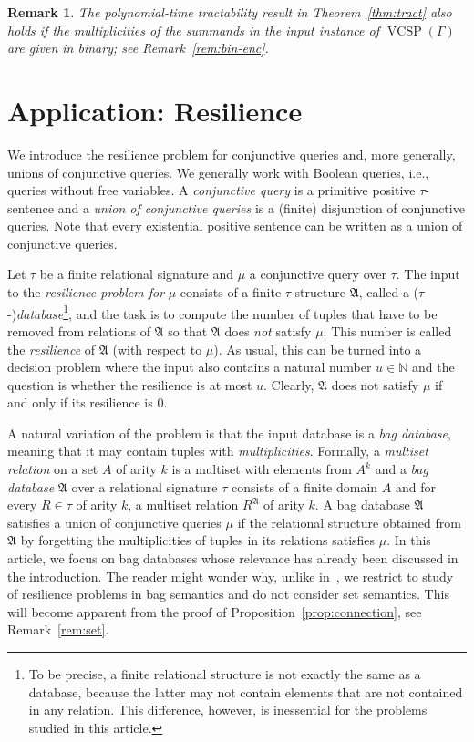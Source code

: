 \documentclass[nonacm]{acmart}
\newcommand{\bA}{{\mathfrak A}}
\DeclareMathOperator{\VCSP}{VCSP}
\newtheorem{remark}[theorem]{Remark}
\begin{document}
\begin{remark}\label{rem:bin-enc-2}
    The polynomial-time tractability result in Theorem~\ref{thm:tract} also holds if the multiplicities of the summands in the input instance of 
    $\VCSP(\Gamma)$ are given in binary; see Remark~\ref{rem:bin-enc}.
\end{remark}

\section{Application: Resilience}
\label{sect:resilience}

We introduce the resilience problem for
conjunctive queries and, more generally,
unions of conjunctive queries.
We generally work with Boolean queries, i.e., queries without free variables. 
A \emph{conjunctive query} is a primitive positive $\tau$-sentence and 
a \emph{union of conjunctive queries} is a (finite) disjunction of conjunctive
queries. Note that every existential positive sentence can be written as a union of conjunctive queries.

Let $\tau$ be a finite relational signature and $\mu$ a conjunctive query  over $\tau$. The input to the \emph{resilience problem for} $\mu$ consists of 
a finite $\tau$-structure $\bA$, called a ($\tau$-)\emph{database}\footnote{To be precise, a finite relational structure is not exactly the same as a database, because the latter may not contain elements that are not contained in any relation. This difference, however, is inessential for the problems studied in this article.}, and the 
task is to compute the number of tuples that have to be removed from relations of $\bA$ so that $\bA$ does \emph{not} satisfy $\mu$. This number is called the \emph{resilience} of $\bA$ (with respect to $\mu$). 
As usual, this can be turned into a decision problem where the input also contains a natural number $u \in {\mathbb N}$ and the question is whether the resilience is at most $u$. 
Clearly, $\bA$ does not satisfy $\mu$ if and only if its resilience is $0$. 

 A natural variation of the problem is that the input database is a \emph{bag database}, meaning that it may contain tuples with \emph{multiplicities}. 
Formally,
 a \emph{multiset relation} on a set $A$ of arity $k$ is a multiset with elements from $A^k$ and a \emph{bag database} $\bA$ over a relational signature $\tau$ consists of a finite domain $A$ and for every $R \in \tau$ of arity $k$, a multiset relation $R^\bA$ of arity $k$. A bag database $\bA$ satisfies a union of conjunctive queries $\mu$ if the relational structure obtained from $\bA$ by forgetting the multiplicities of tuples in its relations satisfies $\mu$.
In this article, we focus on bag databases whose relevance
has already been discussed in the introduction.
The reader might wonder why, unlike in~\cite{LatestResilience}, we restrict to study of resilience problems in bag semantics and do not consider set semantics. This will become apparent from the proof of Proposition~\ref{prop:connection}, see Remark~\ref{rem:set}.
\end{document}
